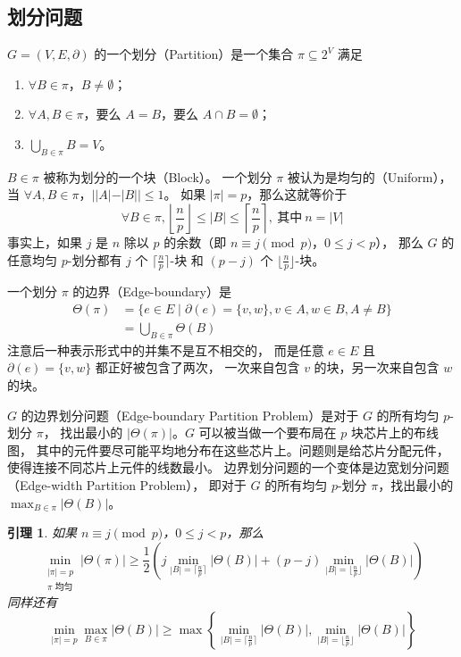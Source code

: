 \documentclass[12pt, a4paper]{article}
\newtheorem{lemma}{引理}
\begin{document}
\subsection{划分问题}
\label{Subsection 3.3}

$G = (V, E, \partial)$ 的一个划分（Partition）是一个集合 $\pi \subseteq 2^V$ 满足
\begin{enumerate}[(1)]
	\item $\forall B \in \pi$，$B \neq \emptyset$；
	\item $\forall A, B \in \pi$，要么 $A = B$，要么 $A \cap B = \emptyset$；
	\item $\bigcup_{B \in \pi} B = V$。
\end{enumerate}

$B \in \pi$ 被称为划分的一个块（Block）。
一个划分 $\pi$ 被认为是均匀的（Uniform），当 $\forall A, B \in \pi$，$||A| − |B|| \le 1$。
如果 $|\pi| = p$，那么这就等价于
\begin{equation*}
\forall B \in \pi,
\left\lfloor\frac{n}{p}\right\rfloor \le |B| \le \left\lceil\frac{n}{p}\right\rceil,
\ \text{其中}\ n = |V|
\end{equation*}
事实上，如果 $j$ 是 $n$ 除以 $p$ 的余数（即 $n \equiv j \pmod p$，$0 \le j < p$），
那么 $G$ 的任意均匀 $p$-划分都有 $j$ 个 $\lceil\frac{n}{p}\rceil$-块
和 $(p - j)$ 个 $\lfloor\frac{n}{p}\rfloor$-块。

一个划分 $\pi$ 的边界（Edge-boundary）是
\begin{align*}
\Theta(\pi) & = \{e \in E \mid \partial(e) = \{v, w\}, v \in A, w \in B, A \ne B\} \\
	    & = \bigcup_{B \in \pi} \Theta(B)
\end{align*}
注意后一种表示形式中的并集不是互不相交的，
而是任意 $e \in E$ 且 $\partial(e) = \{v, w\}$ 都正好被包含了两次，
一次来自包含 $v$ 的块，另一次来自包含 $w$ 的块。

$G$ 的边界划分问题（Edge-boundary Partition Problem）是对于 $G$ 的所有均匀 $p$-划分 $\pi$，
找出最小的 $|\Theta(\pi)|$。$G$ 可以被当做一个要布局在 $p$ 块芯片上的布线图，
其中的元件要尽可能平均地分布在这些芯片上。问题则是给芯片分配元件，
使得连接不同芯片上元件的线数最小。
边界划分问题的一个变体是边宽划分问题（Edge-width Partition Problem），
即对于 $G$ 的所有均匀 $p$-划分 $\pi$，找出最小的 $\max_{B \in \pi} |\Theta(B)|$。

\begin{lemma}
\label{Lemma 5}
如果 $n \equiv j \pmod p$，$0 \le j < p$，那么
\begin{equation*}
\min_{\substack{
	|\pi| = p \\
	\pi \text{ 均匀}
}}|\Theta(\pi)| \ge \frac{1}{2} \left(
	j \min_{|B| = \lceil\frac{n}{p}\rceil} |\Theta(B)| +
	(p - j) \min_{|B| = \lfloor\frac{n}{p}\rfloor} |\Theta(B)|
\right)
\end{equation*}
同样还有
\begin{equation*}
\min_{|\pi| = p} \max_{B \in \pi} |\Theta(B)| \ge \max \left\{
	\min_{|B| = \lceil\frac{n}{p}\rceil} |\Theta(B)|,
	\min_{|B| = \lfloor\frac{n}{p}\rfloor} |\Theta(B)|
\right\}
\end{equation*}
\end{lemma}
\end{document}
